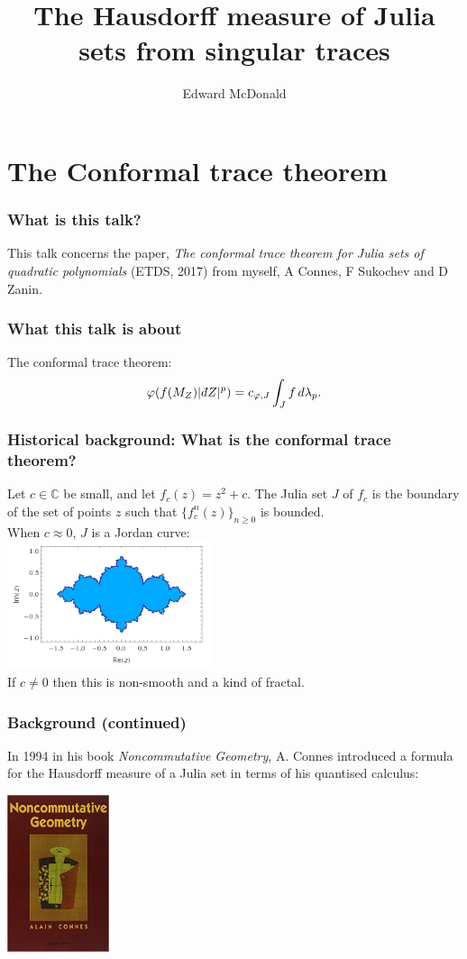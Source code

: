 \documentclass{beamer} %
\title{The Hausdorff measure of Julia sets from singular traces}
\author{Edward McDonald}
\institute{UNSW}
\theoremstyle{definition} %
\newcommand{\Cplx}{\mathbb{C}}
\def\qd{\,{\mathchar'26\mkern-12mu d}}
\begin{document}
\section{The Conformal trace theorem}
\begin{frame} 
\titlepage
\end{frame}

\begin{frame}\frametitle{What is this talk?}
    This talk concerns the paper, 
    \emph{ The conformal trace theorem for Julia sets of quadratic polynomials}
    (ETDS, 2017) from myself, A Connes, F Sukochev and D Zanin.
\end{frame}

\begin{frame}\frametitle{What this talk is about}
    The conformal trace theorem:
    \begin{equation*}
        \varphi(f(M_Z)|\qd Z|^p) = c_{\varphi,J}\int_J f\,d\lambda_p.
    \end{equation*}
\end{frame}

\begin{frame}\frametitle{Historical background: What is the conformal trace theorem?}
    Let $c \in \Cplx$ be small, and let $f_c(z) = z^2+c$. The Julia set $J$ of $f_c$ is the boundary of the set of points $z$ such that $\{f_c^n(z)\}_{n\geq 0}$ is bounded.\\
    When $c \approx 0$, $J$ is a Jordan curve:\\
    \includegraphics[width=60mm]{img/julia-07001-filled.png}\\
    If $c \neq 0$ then this is non-smooth and a kind of fractal.
\end{frame}

\begin{frame}\frametitle{Background (continued)}
    In 1994 in his book {\it Noncommutative Geometry}, A. Connes introduced a formula for the Hausdorff measure of a Julia set in terms of his quantised calculus:
    \begin{center}
    \includegraphics[width=30mm]{img/ncg-book-cover.jpg}
    \end{center}
\end{frame}
\end{document}
